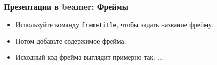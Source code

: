 \begin{frame}
  \frametitle{Презентации в beamer: Фреймы}
  \begin{itemize}
    \item Используйте команду \texttt{frametitle}, чтобы
      задать название фрейму.
    \item Потом добавьте содержимое фрейма.
    \item Исходный код фрейма выглядит примерно так: ...
  \end{itemize}
\end{frame}

